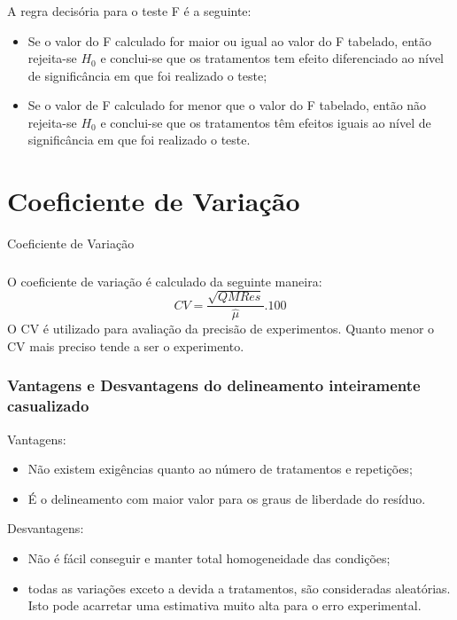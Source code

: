 \documentclass[14pt,aspectratio=1610]{beamer}
\begin{document}
\begin{frame}{}
\frametitle{}
\begin{block}{}
\justifying
A regra decisória para o teste F é a seguinte:
\begin{itemize}
\item Se o valor do F calculado for maior ou igual ao valor do F tabelado, então rejeita-se $H_{0}$ e conclui-se que os tratamentos tem efeito diferenciado ao nível de significância em que foi realizado o teste;\pause
\item Se o valor de F calculado for menor que o valor do F tabelado, então não rejeita-se $H_{0}$ e conclui-se que os tratamentos têm efeitos iguais ao nível de significância em que foi realizado o teste.
\end{itemize}
\end{block}
\end{frame}

\section{Coeficiente de Variação}
\begin{frame}{Coeficiente de Variação}
\frametitle{}
\begin{block}{}
\justifying
O coeficiente de variação é calculado da seguinte maneira:
$$CV=\dfrac{\sqrt{QMRes}}{\hat{\mu}}.100$$
O CV é utilizado para avaliação da precisão de experimentos. Quanto menor o CV
mais preciso tende a ser o experimento.
\end{block}
\end{frame}

\begin{frame}{}
\frametitle{Vantagens e Desvantagens do delineamento inteiramente casualizado}
\begin{block}{Vantagens:}
\begin{itemize}
\item Não existem exigências quanto ao número de tratamentos e repetições;\pause
\item É o delineamento com maior valor para os graus de liberdade do resíduo.
\end{itemize}
\end{block}
\pause
\begin{block}{Desvantagens:}
\begin{itemize}
\item Não é fácil conseguir e manter total homogeneidade das condições;\pause
\item todas as variações exceto a devida a tratamentos, são consideradas aleatórias. Isto pode acarretar uma estimativa muito alta para o erro experimental.
\end{itemize}
\end{block}
\end{frame}
\end{document}

